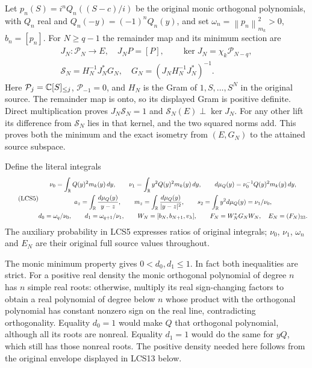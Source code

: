 \documentclass[11pt,a4paper]{article}
\providecommand{\PP}{\mathcal P}
\providecommand{\norm}[1]{\left\lVert#1\right\rVert}
\begin{document}
Let $p_n(S)=i^nQ_n((S-c)/i)$ be the original monic orthogonal
polynomials, with $Q_n$ real and
$Q_n(-y)=(-1)^nQ_n(y)$, and set
$\omega_n=\norm{p_n}_{m_k}^2>0$, $b_n=[p_n]$.
For $N\ge q-1$ the remainder map and its minimum section are
\begin{equation}\tag{LCS4}
\begin{gathered}
 J_N:\PP_N\longrightarrow E,\quad J_NP=[P],\qquad
 \ker J_N=\chi_k\PP_{N-q},\\
 \mathscr S_N=H_N^{-1}J_N^*G_N,\quad
 G_N=(J_NH_N^{-1}J_N^*)^{-1}.
\end{gathered}
\end{equation}
Here $\PP_j=\C[S]_{\le j}$, $\PP_{-1}=0$, and $H_N$ is the
Gram of $1,S,\ldots,S^N$ in the original source. The remainder map
is onto, so its displayed Gram is positive definite. Direct
multiplication proves $J_N\mathscr S_N=1$ and
$\mathscr S_N(E)\perp\ker J_N$. For any other lift its difference
from $\mathscr S_N$ lies in that kernel, and the two squared norms
add. This proves both the minimum and the exact isometry from
$(E,G_N)$ to the attained source subspace.

Define the literal integrals
\begin{equation}\tag{LCS5}
\begin{gathered}
 \nu_0=\int_\mathbb R Q(y)^2m_k(y)\,dy,\qquad
 \nu_1=\int_\mathbb R y^2Q(y)^2m_k(y)\,dy,\qquad
 d\mu_Q(y)=\nu_0^{-1}Q(y)^2m_k(y)\,dy,\\
 a_z=\int_\mathbb R\frac{d\mu_Q(y)}{y-z},\qquad
 m_z=\int_\mathbb R\frac{d\mu_Q(y)}{|y-z|^2},\qquad
 s_2=\int_\mathbb R y^2d\mu_Q(y)=\nu_1/\nu_0,\\
 d_0=\omega_q/\nu_0,\qquad d_1=\omega_{q+1}/\nu_1,\qquad
 W_N=[b_N,b_{N+1},v_\lambda],\qquad
 F_N=W_N^*G_NW_N,\quad E_N=(F_N)_{33}.
\end{gathered}
\end{equation}
The auxiliary probability in LCS5 expresses ratios of original
integrals; $\nu_0$, $\nu_1$, $\omega_n$ and $E_N$ are their original
full source values throughout.

The monic minimum property gives $0<d_0,d_1\le1$. In fact both
inequalities are strict. For a positive real density the monic
orthogonal polynomial of degree $n$ has $n$ simple real roots:
otherwise, multiply its real sign-changing factors to obtain a
real polynomial of degree below $n$ whose product with the
orthogonal polynomial has constant nonzero sign on the real line,
contradicting orthogonality. Equality $d_0=1$ would make $Q$ that
orthogonal polynomial, although all its roots are nonreal.
Equality $d_1=1$ would do the same for $yQ$, which still has those
nonreal roots. The positive density needed here follows from the
original envelope displayed in LCS13 below.
\end{document}
